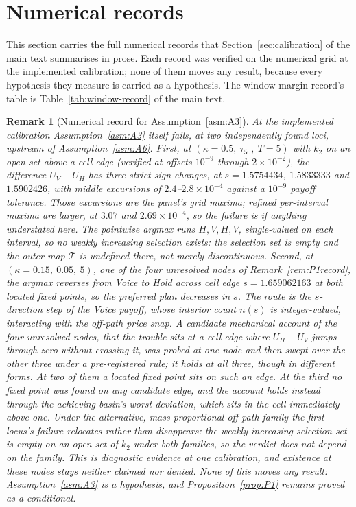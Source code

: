 \documentclass[11pt]{article}
\newtheorem{remark}{Remark}
\newcommand{\Tmap}{\mathcal{T}}
\begin{document}
\section{Numerical records}
\label{sec:app-records}

\noindent This section carries the full numerical records that Section~\ref{sec:calibration} of the main
text summarises in prose. Each record was verified on the numerical grid at the implemented
calibration; none of them moves any result, because every hypothesis they measure is carried as a
hypothesis. The window-margin record's table is Table~\ref{tab:window-record} of the main text.

\begin{remark}[Numerical record for Assumption~\ref{asm:A3}]
\label{rem:A3record}
At the implemented calibration Assumption~\ref{asm:A3} itself fails, at two independently found
loci, upstream of Assumption~\ref{asm:A6}. First, at $(\kappa = 0.5,\ \tau_{50},\ T = 5)$ with $k_2$
on an \emph{open set} above a cell edge (verified at offsets $10^{-9}$ through
$2\times10^{-2}$), the difference $U_V - U_H$ has three strict sign changes, at
$s = 1.5754434$, $1.5833333$ and $1.5902426$, with middle excursions of $2.4$--$2.8\times10^{-4}$
against a $10^{-9}$ payoff tolerance. Those excursions are the panel's grid maxima; refined
per-interval maxima are larger, at $3.07$ and $2.69\times10^{-4}$, so the failure is if anything
understated here. The pointwise argmax runs $H,V,H,V$, single-valued on each
interval, so no weakly increasing selection exists: the selection set is empty and the outer map
$\Tmap$ is \emph{undefined} there, not merely discontinuous. Second, at
$(\kappa = 0.15,\ 0.05,\ 5)$, one of the four unresolved nodes of Remark~\ref{rem:P1record},
the argmax reverses from Voice to Hold across cell edge $s = 1.659062163$ at both located fixed
points, so the preferred plan decreases in $s$. The route is the $s$-direction step of the Voice
payoff, whose interior count $n(s)$ is integer-valued, interacting with the off-path price snap. A
candidate mechanical account of the four unresolved nodes, that the trouble sits at a cell edge
where $U_H - U_V$ jumps through zero without crossing it, was probed at one node and then swept
over the other three under a pre-registered rule; it holds at all three, though in different forms.
At two of them a located fixed point sits on such an edge. At the third no fixed point was found on
any candidate edge, and the account holds instead through the achieving basin's worst deviation,
which sits in the cell immediately above one. Under the alternative, mass-proportional off-path
family the first locus's failure relocates rather than disappears: the weakly-increasing-selection
set is empty on an open set of $k_2$ under both families, so the verdict does not depend on the
family. This is diagnostic evidence at one calibration, and existence at these nodes stays neither
claimed nor denied. None of this moves any result: Assumption~\ref{asm:A3} is a hypothesis, and
Proposition~\ref{prop:P1} remains proved as a conditional.
\end{remark}
\end{document}
